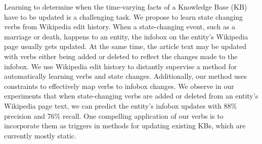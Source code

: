 Learning to determine when the time-varying facts of a Knowledge Base (KB) have to be updated is a challenging task. We propose to learn state changing verbs from Wikipedia edit history. When a state-changing event, such as a marriage or death, happens to an entity, the infobox on the entity's Wikipedia page usually gets updated. At the same time, the article text may be updated with verbs either being added or deleted to reflect the changes made to the infobox. We use Wikipedia edit history to distantly supervise a method for automatically learning verbs and state changes. Additionally, our method uses constraints to effectively map verbs to infobox changes. We observe in our experiments that when state-changing verbs are added or deleted from an entity's Wikipedia page text, we can predict the entity's infobox updates with 88\% precision and 76\% recall. One compelling application of our verbs is to incorporate them as triggers in methods for updating existing KBs, which are currently mostly static.
